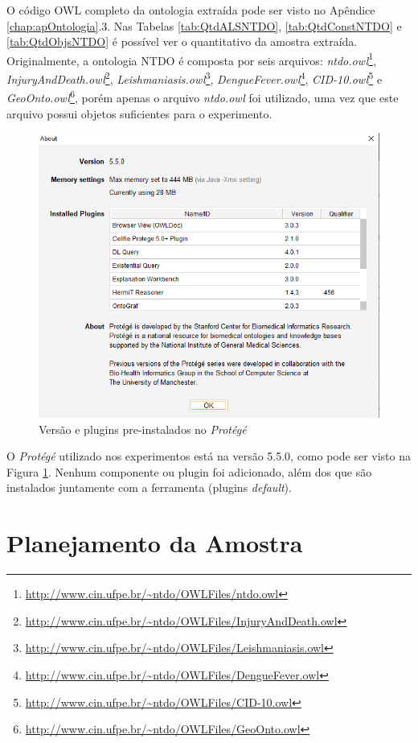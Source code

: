 \documentclass{bcc}
\begin{document}
O código OWL completo da ontologia extraída pode ser visto no Apêndice \ref{chap:apOntologia}.3. Nas Tabelas \ref{tab:QtdALSNTDO}, \ref{tab:QtdConstNTDO} e \ref{tab:QtdObjsNTDO} é possível ver o quantitativo da amostra extraída. Originalmente, a ontologia NTDO é composta por seis arquivos: \textit{ntdo.owl}\footnote{\url{http://www.cin.ufpe.br/~ntdo/OWLFiles/ntdo.owl}}, \textit{InjuryAndDeath.owl}\footnote{\url{http://www.cin.ufpe.br/~ntdo/OWLFiles/InjuryAndDeath.owl}}, \textit{Leishmaniasis.owl}\footnote{\url{http://www.cin.ufpe.br/~ntdo/OWLFiles/Leishmaniasis.owl}}, \textit{DengueFever.owl}\footnote{\url{http://www.cin.ufpe.br/~ntdo/OWLFiles/DengueFever.owl}}, \textit{CID-10.owl}\footnote{\url{http://www.cin.ufpe.br/~ntdo/OWLFiles/CID-10.owl}} e \textit{GeoOnto.owl}\footnote{\url{http://www.cin.ufpe.br/~ntdo/OWLFiles/GeoOnto.owl}}, porém apenas o arquivo \textit{ntdo.owl} foi utilizado, uma vez que este arquivo possui objetos suficientes para o experimento.

\begin{figure}[H]
\centering
\includegraphics[width=.5\textwidth]{Figuras/protege.png}
\caption{Versão e plugins pre-instalados no \textit{Protégé} } 
\label{fig:protege}
\end{figure}

O \textit{Protégé} utilizado nos experimentos está na versão 5.5.0, como pode ser visto na Figura \ref{fig:protege}. Nenhum componente ou plugin foi adicionado, além dos que são instalados juntamente com a ferramenta (plugins \textit{default}).

\section{Planejamento da Amostra}
\end{document}
